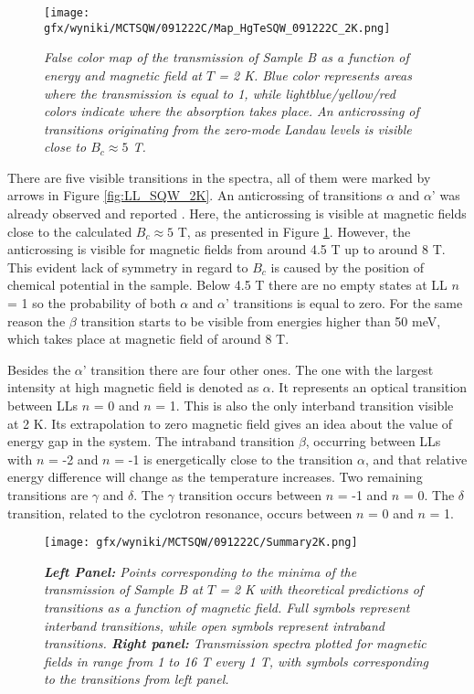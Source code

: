 \documentclass[titlepage,a4paper]{book}
\begin{document}
\begin{figure}[ht]
	\centering
	\texttt{[image: gfx/wyniki/MCTSQW/091222C/Map\_HgTeSQW\_091222C\_2K.png]}
	\vspace{-10pt}
	\caption{\textit{False color map of the transmission of Sample B as a function of energy and magnetic field at $T$ = 2 K. Blue color represents areas where the transmission is equal to 1, while lightblue/yellow/red colors indicate where the absorption takes place. An anticrossing of transitions originating from the zero-mode Landau levels is visible close to $B_c \approx 5$ T. }}
	\label{fig:Map_SQW_2K}
\end{figure}

There are five visible transitions in the spectra, all of them were marked by arrows in Figure \ref{fig:LL_SQW_2K}. An anticrossing of transitions $\alpha$ and $\alpha$' was already observed and reported \cite{Orlita_MCT_QW}\cite{Zholudev_MCT_QW}\cite{Zholudev_MCT_QW_anticrossing}. Here, the anticrossing is visible at magnetic fields close to the calculated $B_c \approx 5$ T, as presented in Figure \ref{fig:Map_SQW_2K}. However, the anticrossing is visible for magnetic fields from around 4.5 T up to around 8 T. This evident lack of symmetry in regard to $B_c$ is caused by the position of chemical potential in the sample. Below 4.5 T there are no empty states at LL $n$ = 1 so the probability of both $\alpha$ and $\alpha$' transitions is equal to zero. For the same reason the $\beta$ transition starts to be visible from energies higher than 50 meV, which takes place at magnetic field of around 8 T.

Besides the $\alpha$' transition there are four other ones. The one with the largest intensity at high magnetic field is denoted as $\alpha$. It represents an optical transition between LLs $n$ = 0 and $n$ = 1. This is also the only interband transition visible at 2 K. Its extrapolation to zero magnetic field gives an idea about the value of energy gap in the system. The intraband transition $\beta$, occurring between LLs with $n$ = -2 and $n$ = -1 is energetically close to the transition $\alpha$, and that relative energy difference will change as the temperature increases. Two remaining transitions are $\gamma$ and $\delta$. The $\gamma$ transition occurs between $n$ = -1 and $n$ = 0. The $\delta$ transition, related to the cyclotron resonance, occurs between $n$ = 0 and $n$ = 1.

\begin{figure}[ht]
	\centering
	\texttt{[image: gfx/wyniki/MCTSQW/091222C/Summary2K.png]}
	\vspace{-10pt}
	\caption{\textit{\textbf{Left Panel:} Points corresponding to the minima of the transmission of Sample B at $T$ = 2 K with theoretical predictions of transitions as a function of magnetic field. Full symbols represent interband transitions, while open symbols represent intraband transitions. \textbf{Right panel:} Transmission spectra plotted for magnetic fields in range from 1 to 16 T every 1 T, with symbols corresponding to the transitions from left panel.}}
	\label{fig:Summary_SQW_2K}
\end{figure}
\end{document}
